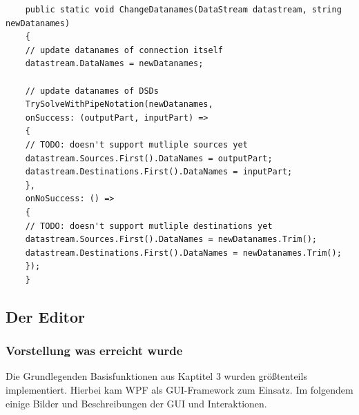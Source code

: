 \begin{enumerate}
	\begin{verbatim}
	public static void ChangeDatanames(DataStream datastream, string newDatanames)
	{
	// update datanames of connection itself
	datastream.DataNames = newDatanames;
	
	// update datanames of DSDs
	TrySolveWithPipeNotation(newDatanames,
	onSuccess: (outputPart, inputPart) =>
	{
	// TODO: doesn't support mutliple sources yet
	datastream.Sources.First().DataNames = outputPart;
	datastream.Destinations.First().DataNames = inputPart;
	},
	onNoSuccess: () =>
	{
	// TODO: doesn't support mutliple destinations yet
	datastream.Sources.First().DataNames = newDatanames.Trim();
	datastream.Destinations.First().DataNames = newDatanames.Trim();
	});
	}
	\end{verbatim}
\end{enumerate}



\subsection{Der Editor}
\label{sec:orgheadline33}
\subsubsection{Vorstellung was erreicht wurde}
\label{sec:orgheadline22}

Die Grundlegenden Basisfunktionen aus Kaptitel 3 wurden größtenteils
implementiert. Hierbei kam WPF als GUI-Framework zum Einsatz.
Im folgendem einige Bilder und Beschreibungen der GUI und Interaktionen.


